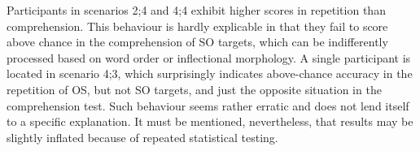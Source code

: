 \begin{table}
    \caption{Learners in scenario 4}
    \label{tab:06:9}
\end{table}

Participants in scenarios 2;4 and 4;4 exhibit higher scores in repetition than comprehension. This behaviour is hardly explicable in that they fail to score above chance in the comprehension of SO targets, which can be indifferently processed based on word order or inflectional morphology. A single participant is located in scenario 4;3, which surprisingly indicates above-chance accuracy in the repetition of OS, but not SO targets, and just the opposite situation in the comprehension test. Such behaviour seems rather erratic and does not lend itself to a specific explanation. It must be mentioned, nevertheless, that results may be slightly inflated because of repeated statistical testing. 


